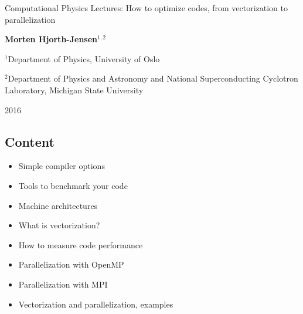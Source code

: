 \documentclass[%
oneside,                 %
final,                   %
10pt]{article}
\begin{document}

\newcommand{\exercisesection}[1]{\subsection*{#1}}






\thispagestyle{empty}

\begin{center}
{\LARGE\bf
\begin{spacing}{1.25}
Computational Physics Lectures: How to optimize codes, from vectorization to parallelization
\end{spacing}
}
\end{center}


\begin{center}
{\bf Morten Hjorth-Jensen${}^{1, 2}$} \\ [0mm]
\end{center}

\begin{center}
\centerline{{\small ${}^1$Department of Physics, University of Oslo}}
\centerline{{\small ${}^2$Department of Physics and Astronomy and National Superconducting Cyclotron Laboratory, Michigan State University}}
\end{center}
    

\begin{center}
2016
\end{center}

\vspace{1cm}


\subsection{Content}
\begin{itemize}
\item Simple compiler options 

\item Tools to benchmark your code

\item Machine architectures

\item What is vectorization?

\item How to measure code performance

\item Parallelization with OpenMP

\item Parallelization with MPI

\item Vectorization and parallelization, examples
\end{itemize}
\end{document}
